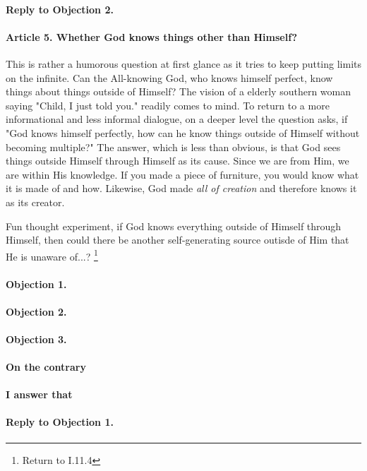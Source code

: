 \documentclass{ucetd}
\begin{document}
\paragraph{Reply to Objection 2.}

\paragraph{Article 5. Whether God knows things other than Himself?}
This is rather a humorous question at first glance as it tries to keep putting limits on the infinite. Can the All-knowing God, who knows himself perfect, know things about things outside of Himself? The vision of a elderly southern woman saying "Child, I just told you." readily comes to mind.
To return to a more informational and less informal dialogue, on a deeper level the question asks, if "God knows himself perfectly, how can he know things outside of Himself without becoming multiple?" The answer, which is less than obvious, is that God sees things outside Himself through Himself as its cause. Since we are from Him, we are within His knowledge. If you made a piece of furniture, you would know what it is made of and how. Likewise, God made \textit{all of creation} and therefore knows it as its creator.

Fun thought experiment, if God knows everything outside of Himself through Himself, then could there be another self-generating source outisde of Him that He is unaware of...? \footnote{Return to I.11.4}
\paragraph{Objection 1.}
\paragraph{Objection 2.}
\paragraph{Objection 3.}
\paragraph{On the contrary}
\paragraph{I answer that}
\paragraph{Reply to Objection 1.}
\end{document}
